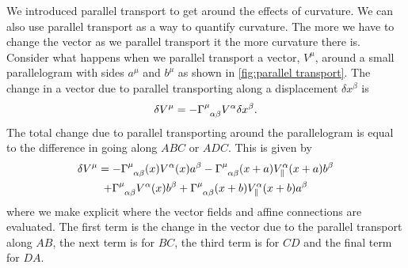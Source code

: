 \documentclass[fleqn]{NotesClass}
\newcommand*{\christoffel}[3]{\tensor{\Gamma}{^{#1}_{{#2}{#3}}}}
\begin{document}
    We introduced parallel transport to get around the effects of curvature.
    We can also use parallel transport as a way to quantify curvature.
    The more we have to change the vector as we parallel transport it the more curvature there is.
    Consider what happens when we parallel transport a vector, \(V^\mu\), around a small parallelogram with sides \(a^\mu\) and \(b^\mu\) as shown in \cref{fig:parallel transport}.
    The change in a vector due to parallel transporting along a displacement \(\delta x^\beta\) is
    \begin{equation}
        \delta V^\mu = -\christoffel{\mu}{\alpha}{\beta} V^\alpha \delta x^\beta.
    \end{equation}
    The total change due to parallel transporting around the parallelogram is equal to the difference in going along \(ABC\) or \(ADC\).
    This is given by
    \begin{multline}
        \delta V^\mu = -\christoffel{\mu}{\alpha}{\beta}(x) V^\alpha(x) a^\beta - \christoffel{\mu}{\alpha}{\beta}(x + a) V_{\|}^{\alpha}(x + a) b^\beta\\
        + \christoffel{\mu}{\alpha}{\beta} V^\alpha(x)b^\beta + \christoffel{\mu}{\alpha}{\beta}(x + b) V_{\|}^\alpha (x + b) a^\beta
    \end{multline}
    where we make explicit where the vector fields and affine connections are evaluated.
    The first term is the change in the vector due to the parallel transport along \(AB\), the next term is for \(BC\), the third term is for \(CD\) and the final term for \(DA\).
    
\end{document}
